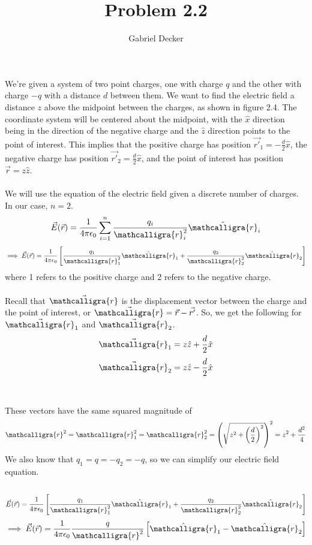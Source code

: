 \documentclass[12pt]{article}
\title{Problem 2.2}
\author{Gabriel Decker}
\newcommand{\scripty}[1]{\ensuremath{\mathcalligra{#1}}}
\begin{document}
\maketitle
\begin{flushleft}

We're given a system of two point charges, one with charge $q$ and the other with charge $-q$ with a distance $d$ between them.
We want to find the electric field a distance $z$ above the midpoint between the charges, as shown in figure 2.4.
The coordinate system will be centered about the midpoint, with the $\hat{x}$ direction being in the direction of the negative charge and the $\hat{z}$ direction points to the point of interest.
This implies that the positive charge has position $\vec{r'}_1=-\frac{d}{2}\hat{x}$, the negative charge has position $\vec{r'}_2=\frac{d}{2}\hat{x}$, and the point of interest has position $\vec{r}=z\hat{z}$.\\~\\

We will use the equation of the electric field given a discrete number of charges.
In our case, $n=2$.
$$\vec{E}(\vec{r})=\frac{1}{4\pi\epsilon_0}\sum_{i=1}^n\frac{q_i}{\scripty{r}_i^2}\hat{\scripty{r}}_i$$
$$\implies\vec{E}(\vec{r})=\frac{1}{4\pi\epsilon_0}\left[\frac{q_1}{\scripty{r}_1^2}\hat{\scripty{r}}_1+\frac{q_2}{\scripty{r}_2^2}\hat{\scripty{r}}_2\right]$$
where 1 refers to the positive charge and 2 refers to the negative charge.\\~\\

Recall that $\vec{\scripty{r}}$ is the displacement vector between the charge and the point of interest, or $\vec{\scripty{r}}=\vec{r}-\vec{r'}$.
So, we get the following for $\vec{\scripty{r}}_1$ and $\vec{\scripty{r}}_2$.
$$\vec{\scripty{r}}_1=z\hat{z}+\frac{d}{2}\hat{x}$$
$$\vec{\scripty{r}}_2=z\hat{z}-\frac{d}{2}\hat{x}$$\\~\\

These vectors have the same squared magnitude of
$$\scripty{r}^2=\scripty{r}_1^2=\scripty{r}_2^2=\left(\sqrt{z^2+\left(\frac{d}{2}\right)^2}\right)^2=z^2+\frac{d^2}{4}$$
We also know that $q_1=q=-q_2=-q$, so we can simplify our electric field equation.\\~\\
$$\vec{E}(\vec{r})=\frac{1}{4\pi\epsilon_0}\left[\frac{q_1}{\scripty{r}_1^2}\hat{\scripty{r}}_1+\frac{q_2}{\scripty{r}_2^2}\hat{\scripty{r}}_2\right]$$
$$\implies\vec{E}(\vec{r})=\frac{1}{4\pi\epsilon_0}\frac{q}{\scripty{r}^2}\left[\hat{\scripty{r}}_1-\hat{\scripty{r}}_2\right]$$\\~\\


\end{flushleft}
\end{document}
